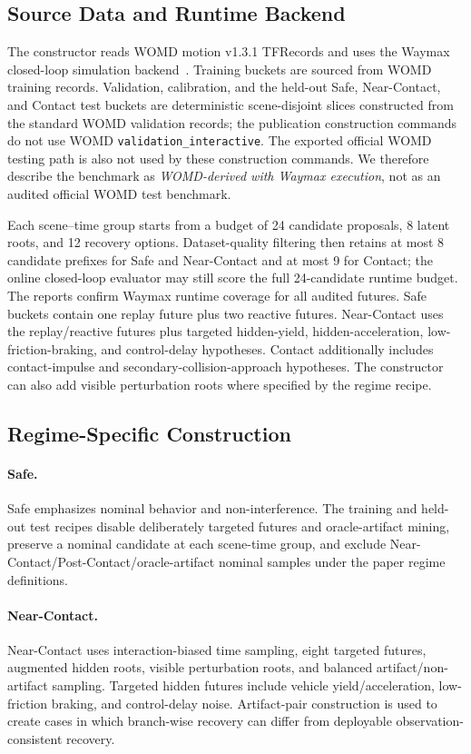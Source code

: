 \documentclass{article} %
\begin{document}
\subsection{Source Data and Runtime Backend}
The constructor reads WOMD motion v1.3.1 TFRecords and uses the Waymax closed-loop simulation backend~\citep{ettinger2021large,gulino2023waymax}. Training buckets are sourced from WOMD training records. Validation, calibration, and the held-out Safe, Near-Contact, and Contact test buckets are deterministic scene-disjoint slices constructed from the standard WOMD validation records; the publication construction commands do not use WOMD \texttt{validation\_interactive}. The exported official WOMD testing path is also not used by these construction commands. We therefore describe the benchmark as \emph{WOMD-derived with Waymax execution}, not as an audited official WOMD test benchmark.

Each scene--time group starts from a budget of 24 candidate proposals, 8 latent roots, and 12 recovery options. Dataset-quality filtering then retains at most 8 candidate prefixes for Safe and Near-Contact and at most 9 for Contact; the online closed-loop evaluator may still score the full 24-candidate runtime budget. The reports confirm Waymax runtime coverage for all audited futures. Safe buckets contain one replay future plus two reactive futures. Near-Contact uses the replay/reactive futures plus targeted hidden-yield, hidden-acceleration, low-friction-braking, and control-delay hypotheses. Contact additionally includes contact-impulse and secondary-collision-approach hypotheses. The constructor can also add visible perturbation roots where specified by the regime recipe.

\subsection{Regime-Specific Construction}
\paragraph{Safe.}
Safe emphasizes nominal behavior and non-interference. The training and held-out test recipes disable deliberately targeted futures and oracle-artifact mining, preserve a nominal candidate at each scene-time group, and exclude Near-Contact/Post-Contact/oracle-artifact nominal samples under the paper regime definitions.

\paragraph{Near-Contact.}
Near-Contact uses interaction-biased time sampling, eight targeted futures, augmented hidden roots, visible perturbation roots, and balanced artifact/non-artifact sampling. Targeted hidden futures include vehicle yield/acceleration, low-friction braking, and control-delay noise. Artifact-pair construction is used to create cases in which branch-wise recovery can differ from deployable observation-consistent recovery.
\end{document}
